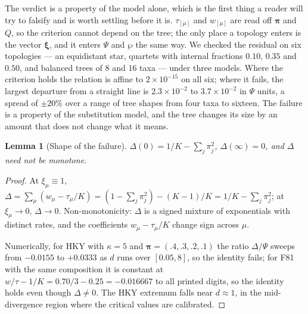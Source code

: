 \documentclass[11pt]{article}
\newcommand{\bpi}{\boldsymbol{\pi}}
\newcommand{\bxi}{\boldsymbol{\xi}}
\newtheorem{lemma}[theorem]{Lemma}
\theoremstyle{definition}
\theoremstyle{remark}
\begin{document}
The verdict is a property of the model alone, which is the first thing a
reader will try to falsify and is worth settling before it is. $\tau_{[\mu]}$
and $w_{[\mu]}$ are read off $\bpi$ and $Q$, so the criterion cannot depend on
the tree; the only place a topology enters is the vector $\bxi$, and it enters
$\Psi$ and $\wp$ the same way. We checked the residual on six topologies ---
an equidistant star, quartets with internal fractions $0.10$, $0.35$ and
$0.50$, and balanced trees of $8$ and $16$ taxa --- under three models. Where
the criterion holds the relation is affine to $2\times10^{-15}$ on all six;
where it fails, the largest departure from a straight line is
$2.3\times10^{-2}$ to $3.7\times10^{-2}$ in $\Psi$ units, a spread of
$\pm20\%$ over a range of tree shapes from four taxa to sixteen. The failure
is a property of the substitution model, and the tree changes its size by an
amount that does not change what it means.

\begin{lemma}[Shape of the failure]
\label{lem:delta}
$\Delta(0)=1/K-\sum_j\pi_j^2$, $\Delta(\infty)=0$, and $\Delta$ need not be
monotone.
\end{lemma}

\begin{proof}
At $\xi_\mu\equiv1$, $\Delta=\sum_\mu(w_\mu-\tau_\mu/K)=(1-\sum_j\pi_j^2)-(K-1)/K=1/K-\sum_j\pi_j^2$;
at $\xi_\mu\to0$, $\Delta\to0$. Non-monotonicity: $\Delta$ is a signed mixture
of exponentials with distinct rates, and the coefficients
$w_\mu-\tau_\mu/K$ change sign across $\mu$.

Numerically, for HKY with $\kappa=5$ and $\bpi=(.4,.3,.2,.1)$ the ratio
$\Delta/\Psi$ sweeps from $-0.0155$ to $+0.0333$ as $d$ runs over
$[0.05,8]$, so the identity fails; for F81 with the same composition it is
constant at $w/\tau-1/K=0.70/3-0.25=-0.016667$ to all printed digits, so the
identity holds even though $\Delta\ne0$. The HKY extremum falls near
$d\approx1$, in the mid-divergence region where the critical values are
calibrated.
\end{proof}
\end{document}
